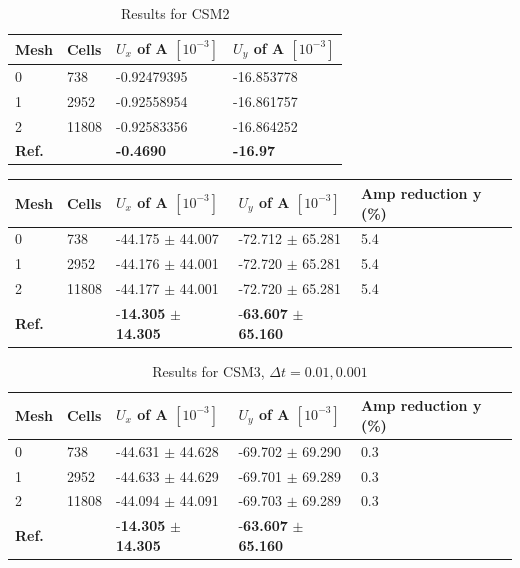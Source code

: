 \begin{table}[!h]
\begin{center}
  \begin{tabular}{|l | l | l | l|} \hline
	Mesh & Cells & $U_x$ of A $[10^{-3}]$ & $U_y$ of A $[10^{-3}]$\\ \hline
    0  & 738 & -0.92479395 & -16.853778 \\   \hline
    1 & 2952 & -0.92558954 & -16.861757 \\ \hline
    2 & 11808 & -0.92583356 & -16.864252   \\ \hline \hline
    \textbf{Ref.}  & & \textbf{-0.4690} & \textbf{-16.97} \\ \hline 
    \hline
  \end{tabular}
\end{center}
\caption{Results for CSM2}
\end{table}

\begin{table}[!h]
\begin{center}
  \begin{tabular}{|l | l | l | l| l|} \hline
	Mesh & Cells & $U_x$ of A $[10^{-3}]$ & $U_y$ of A $[10^{-3}]$ & Amp reduction y (\%) \\ \hline
    0  & 738 & -44.175 $\pm$ 44.007 & -72.712 $\pm$ 65.281 & 5.4  \\   \hline
    1 & 2952 & -44.176 $\pm$ 44.001 & -72.720 $\pm$ 65.281 & 5.4 \\ \hline
    2 & 11808 & -44.177 $\pm$ 44.001 & -72.720 $\pm$ 65.281 & 5.4  \\ \hline \hline
    \textbf{Ref.}  & & -\textbf{14.305} $\pm$ \textbf{14.305} & -\textbf{63.607} $\pm$ \textbf{65.160} \\ \hline 
    \hline
  \end{tabular}
\end{center}
\end{table}


\begin{table}[!h]
\begin{center}
  \begin{tabular}{|l | l | l | l| l|} \hline
	Mesh & Cells & $U_x$ of A $[10^{-3}]$ & $U_y$ of A $[10^{-3}]$ & Amp reduction y (\%) \\ \hline
    0  & 738 & -44.631 $\pm$ 44.628 & -69.702 $\pm$ 69.290 & 0.3  \\   \hline
    1 & 2952 & -44.633 $\pm$ 44.629 & -69.701 $\pm$ 69.289 & 0.3 \\ \hline
    2 & 11808 & -44.094 $\pm$ 44.091 & -69.703 $\pm$ 69.289 & 0.3  \\ \hline \hline
    \textbf{Ref.}  & & -\textbf{14.305} $\pm$ \textbf{14.305} & -\textbf{63.607} $\pm$ \textbf{65.160} \\ \hline 
    \hline
  \end{tabular}
\end{center}
\caption{Results for CSM3, $\Delta t= 0.01, 0.001$}
\end{table}


